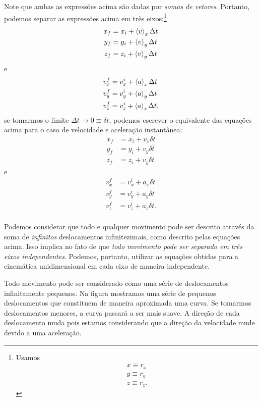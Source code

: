 \pagebreak
\noindent{}Note que ambas as expressões acima são dadas por \emph{somas de vetores}. Portanto, podemos separar as expressões acima em três eixos:\footnote{Usamos \begin{align*} x \equiv r_x \\ y \equiv r_y \\ z \equiv r_z. \end{align*}}
\begin{align}
    x_f &= x_i + \left\langle{v}\right\rangle_x \Delta t \\
    y_f &= y_i + \left\langle{v}\right\rangle_y \Delta t \\
    z_f &= z_i + \left\langle{v}\right\rangle_y \Delta t
\end{align}
%
e
\begin{align}
    v_x^f &= v_x^i + \left\langle{a}\right\rangle_x \Delta t \\
    v_y^f &= v_y^i + \left\langle{a}\right\rangle_y \Delta t \\
    v_z^f &= v_z^i + \left\langle{a}\right\rangle_z \Delta t. \\
\end{align}
%
se tomarmos o limite $\Delta t \to 0 \equiv \delta t$, podemos escrever o equivalente das equações acima para o caso de velocidade e aceleração instantânea:
\begin{align}
    x_f &= x_i + v_x \delta t \\
    y_f &= y_i + v_y \delta t \\
    z_f &= z_i + v_y \delta t
\end{align}
%
e
\begin{align}
    v_x^f &= v_x^i + a_x \delta t \\
    v_y^f &= v_y^i + a_y \delta t \\
    v_z^f &= v_z^i + a_z \delta t. \\
\end{align}

Podemos considerar que todo e qualquer movimento pode ser descrito através da soma de \emph{infinitos} deslocamentos infinitezimais, como descrito pelas equações acima. Isso implica no fato de que \emph{todo movimento pode ser separado em três eixos independentes}. Podemos, portanto, utilizar as equações obtidas para a cinemática unidimensional em cada eixo de maneira independente.

\begin{marginfigure}
\centering
{}
\caption{Todo movimento pode ser considerado como uma série de deslocamentos infinitamente pequenos. Na figura mostramos uma série de pequenos deslocamentos que constituem de maneira aproximada uma curva. Se tomarmos deslocamentos menores, a curva passará a ser mais suave. A direção de cada deslocamento muda pois estamos considerando que a direção da velocidade mude devido a uma aceleração.}
\end{marginfigure}


